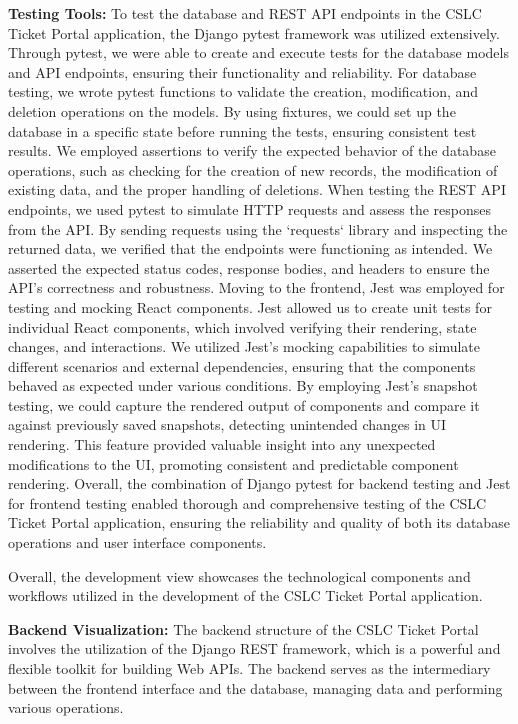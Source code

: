 \documentclass[oneside,openany,obeyspaces]{book}
\begin{document}
\begin{flushleft}
    \textbf{Testing Tools:}
    To test the database and REST API endpoints in the CSLC Ticket Portal application, the Django pytest framework was utilized extensively. Through pytest, we were able to create and execute tests for the database models and API endpoints, ensuring their functionality and reliability.
    For database testing, we wrote pytest functions to validate the creation, modification, and deletion operations on the models. By using fixtures, we could set up the database in a specific state before running the tests, ensuring consistent test results. We employed assertions to verify the expected behavior of the database operations, such as checking for the creation of new records, the modification of existing data, and the proper handling of deletions.
    When testing the REST API endpoints, we used pytest to simulate HTTP requests and assess the responses from the API. By sending requests using the `requests` library and inspecting the returned data, we verified that the endpoints were functioning as intended. We asserted the expected status codes, response bodies, and headers to ensure the API's correctness and robustness.
    Moving to the frontend, Jest was employed for testing and mocking React components. Jest allowed us to create unit tests for individual React components, which involved verifying their rendering, state changes, and interactions. We utilized Jest's mocking capabilities to simulate different scenarios and external dependencies, ensuring that the components behaved as expected under various conditions.
    By employing Jest's snapshot testing, we could capture the rendered output of components and compare it against previously saved snapshots, detecting unintended changes in UI rendering. This feature provided valuable insight into any unexpected modifications to the UI, promoting consistent and predictable component rendering.
    Overall, the combination of Django pytest for backend testing and Jest for frontend testing enabled thorough and comprehensive testing of the CSLC Ticket Portal application, ensuring the reliability and quality of both its database operations and user interface components.

    Overall, the development view showcases the technological components and workflows utilized in the development of the CSLC Ticket Portal application.

    \textbf{Backend Visualization: }
    The backend structure of the CSLC Ticket Portal involves the utilization of the Django REST framework, which is a powerful and flexible toolkit for building Web APIs. The backend serves as the intermediary between the frontend interface and the database, managing data and performing various operations.


\end{flushleft}
\end{document}

